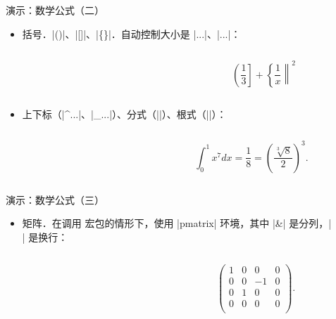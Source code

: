 \begin{frame}[fragile]{演示：数学公式（二）}
	\pause
	\begin{itemize}
		\item<+-> 括号．|()|、|[]|、|\{\}|．自动控制大小是 |\left...|、|\right...|：
			\begin{columns}
				\begin{column}{.55\textwidth}
					
				\end{column}
                \onslide<+->
				\begin{column}{.4\textwidth}
					\[
						\left( \frac{1}{3} \right]
						+\left\{ \frac{1}{x} \right\|^2
					\]
				\end{column}
			\end{columns}
		\item<+-> 上下标（|^{...}|、|_{...}|）、分式（||）、根式（|\sqrt[次数]{内容}|）：
			\begin{columns}
				\begin{column}{.55\textwidth}
					
				\end{column}
                \onslide<+->
				\begin{column}{.4\textwidth}
					\[\int_0^1 x^7 dx = \frac{1}{8} = \left( \frac{\sqrt[3]{8}}{2} \right) ^3.\]
				\end{column}
			\end{columns}
	\end{itemize}
\end{frame}

\begin{frame}[fragile]{演示：数学公式（三）}
	\begin{itemize}
		\item<+-> 矩阵．在调用  宏包的情形下，使用 |pmatrix| 环境，其中 |&| 是分列，|\\| 是换行：
	\end{itemize}
	\begin{columns}
		\begin{column}{.45\textwidth}
			
		\end{column}
        \onslide<+->
		\begin{column}{.45\textwidth}
			\[
				\begin{pmatrix}
					1 & 0 & 0  & 0 \\
					0 & 0 & −1 & 0 \\
					0 & 1 & 0  & 0 \\
					0 & 0 & 0  & 0 \\
				\end{pmatrix}.
			\]
		\end{column}
	\end{columns}
\end{frame}

